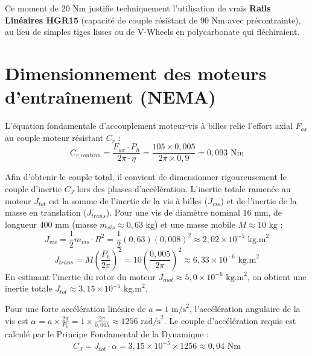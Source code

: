 Ce moment de 20 Nm justifie techniquement l'utilisation de vrais \textbf{Rails Linéaires HGR15} (capacité de couple résistant de $90$ Nm avec précontrainte), au lieu de simples tiges lisses ou de V-Wheels en polycarbonate qui fléchiraient.

\section{Dimensionnement des moteurs d'entraînement (NEMA)}

L'équation fondamentale d'accouplement moteur-vis à billes relie l'effort axial $F_{ax}$ au couple moteur résistant $C_r$ :
\begin{equation}
    C_{r\_continu} = \frac{F_{ax} \cdot P_h}{2\pi \cdot \eta} = \frac{105 \times 0{,}005}{2\pi \times 0{,}9} = \boxed{0{,}093 \text{ Nm}}
\end{equation}

Afin d'obtenir le couple total, il convient de dimensionner rigoureusement le couple d'inertie $C_J$ lors des phases d'accélération. 
L'inertie totale ramenée au moteur $J_{tot}$ est la somme de l'inertie de la vis à billes ($J_{vis}$) et de l'inertie de la masse en translation ($J_{trans}$). Pour une vis de diamètre nominal $16\text{ mm}$, de longueur $400\text{ mm}$ (masse $m_{vis} \approx 0{,}63\text{ kg}$) et une masse mobile $M \approx 10\text{ kg}$ :
\begin{equation}
    J_{vis} = \frac{1}{2} m_{vis} \cdot R^2 = \frac{1}{2} (0{,}63) (0{,}008)^2 \approx 2{,}02 \times 10^{-5} \text{ kg.m}^2
\end{equation}
\begin{equation}
    J_{trans} = M \left(\frac{P_h}{2\pi}\right)^2 = 10 \left(\frac{0{,}005}{2\pi}\right)^2 \approx 6{,}33 \times 10^{-6} \text{ kg.m}^2
\end{equation}
En estimant l'inertie du rotor du moteur $J_{mot} \approx 5{,}0 \times 10^{-6} \text{ kg.m}^2$, on obtient une inertie totale $J_{tot} \approx 3{,}15 \times 10^{-5} \text{ kg.m}^2$.

Pour une forte accélération linéaire de $a = 1\text{ m/s}^2$, l'accélération angulaire de la vis est $\alpha = a \times \frac{2\pi}{P_h} = 1 \times \frac{2\pi}{0{,}005} \approx 1256 \text{ rad/s}^2$. 
Le couple d'accélération requis est calculé par le Principe Fondamental de la Dynamique :
\begin{equation}
    C_J = J_{tot} \cdot \alpha = 3{,}15 \times 10^{-5} \times 1256 \approx \boxed{0{,}04 \text{ Nm}}
\end{equation}

